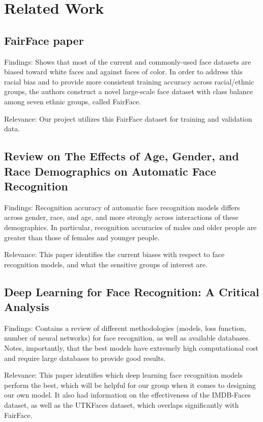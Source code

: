\section{Related Work}
\subsection{FairFace paper \cite{krkkinen2019fairface}}

Findings: Shows that most of the current and commonly-used face datasets are biased toward white faces and against faces of color. In order to address this racial bias and to provide more consistent training accuracy across racial/ethnic groups, the authors construct a novel large-scale face dataset with class balance among seven ethnic groups, called FairFace. 

\noindent Relevance: Our project utilizes this FairFace dataset for training and validation data.

\subsection{Review on The Effects of Age, Gender, and Race Demographics on Automatic Face Recognition \cite{abdurrahim2017review}}

Findings: Recognition accuracy of automatic face recognition models differs across gender, race, and age, and more strongly across interactions of these demographics. In particular, recognition accuracies of males and older people are greater than those of females and younger people.

\noindent Relevance: This paper identifies the current biases with respect to face recognition models, and what the sensitive groups of interest are.

\subsection{Deep Learning for Face Recognition: A Critical Analysis \cite{shepley2019deep}}

Findings: Contains a review of different methodologies (models, loss function, number of neural networks) for face recognition, as well as available databases. Notes, importantly, that the best models have extremely high computational cost and require large databases to provide good results.

\noindent Relevance: This paper identifies which deep learning face recognition models perform the best, which will be helpful for our group when it comes to designing our own model. It also had information on the effectiveness of the IMDB-Faces dataset, as well as the UTKFaces dataset, which overlaps significantly with FairFace.

